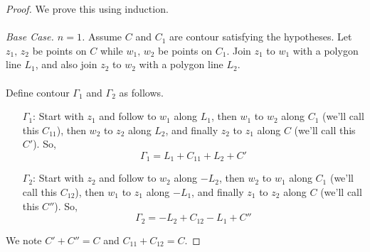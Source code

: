 \begin{proof}
We prove this using induction.\\
\\
\emph{Base Case. $n=1$.} Assume $C$ and $C_1$ are contour satisfying the hypotheses. Let $z_1,\,z_2$ be points on $C$ while $w_1,\,w_2$ be points on $C_1$. Join $z_1$ to $w_1$ with a polygon line $L_1$, and also join $z_2$ to $w_2$ with a polygon line $L_2$.\\
\\
Define contour $\Gamma_1$ and $\Gamma_2$ as follows.
\begin{itemize}
\item[$\Gamma_1$:] Start with $z_1$ and follow to $w_1$ along $L_1$, then $w_1$ to $w_2$ along $C_1$ (we'll call this $C_{11}$), then $w_2$ to $z_2$ along $L_2$, and finally $z_2$ to $z_1$ along $C$ (we'll call this $C'$). So, 
\[\Gamma_1 = L_1 + C_{11} + L_2 + C'\]
\item[$\Gamma_2$:] Start with $z_2$ and follow to $w_2$ along $-L_2$, then $w_2$ to $w_1$ along $C_1$ (we'll call this $C_{12}$), then $w_1$ to $z_1$ along $-L_1$, and finally $z_1$ to $z_2$ along $C$ (we'll call this $C''$). So, 
\[\Gamma_2 = -L_2 + C_{12} - L_1 + C''\]
\end{itemize}
We note $C' + C'' = C$ and $C_{11} + C_{12} = C$.
%

\end{proof}
